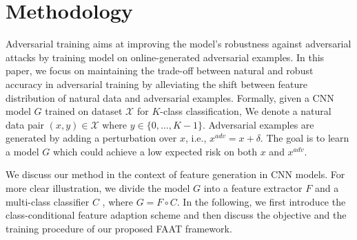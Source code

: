\documentclass[10pt,twocolumn,letterpaper]{article}
\begin{document}
\section{Methodology}
Adversarial training aims at improving the model's robustness against adversarial attacks by training model on online-generated adversarial examples. In this paper, we focus on maintaining the trade-off between natural and robust accuracy in adversarial training by alleviating the shift between feature distribution of natural data and adversarial examples. Formally, given a CNN model $G$ trained on dataset $\mathcal{X}$ for $K$-class classification, We denote a natural data pair $(x,y)\in \mathcal{X}$ where $y\in \{0,...,K-1\}$. Adversarial examples are generated by adding a perturbation over $x$, i.e., $x^{adv}=x+\delta$. The goal is to learn a model $G$ which could achieve a low expected risk on both $x$ and $x^{adv}$.   

We discuss our method in the context of feature generation in CNN models. For more clear illustration, we divide the model $G$ into a feature extractor $F$ and a multi-class classifier $C$ , where $G=F \circ C$. In the following, we first introduce the class-conditional feature adaption scheme and then discuss the objective and the training procedure of our proposed FAAT framework.
\end{document}
